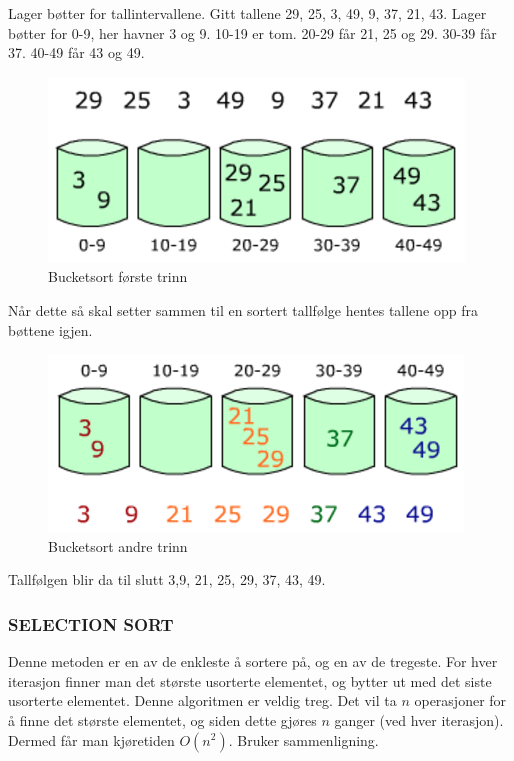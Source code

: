 \begin{boxed}
Lager bøtter for tallintervallene. Gitt tallene 29, 25, 3, 49, 9, 37, 21, 43. Lager bøtter for 0-9, her havner 3 og 9. 10-19 er tom. 20-29 får 21, 25 og 29. 30-39 får 37. 40-49 får 43 og 49.

\begin{figure}[H]
\includegraphics[scale=0.5]{images/bucketsort1}
\centering %
\caption{Bucketsort første trinn}
\label{fig:bucketsort1}
\end{figure}

Når dette så skal setter sammen til en sortert tallfølge hentes tallene opp fra bøttene igjen.

\begin{figure}[H]
\includegraphics[scale=0.5]{images/bucketsort2}
\centering %
\caption{Bucketsort andre trinn}
\label{fig:bucketsort2}
\end{figure}

Tallfølgen blir da til slutt 3,9, 21, 25, 29, 37, 43, 49.
\end{boxed}



\subsubsection{SELECTION SORT}
Denne metoden er en av de enkleste å sortere på, og en av de tregeste. For hver iterasjon finner man det største usorterte elementet, og bytter ut med det siste usorterte elementet. Denne algoritmen er veldig treg. Det vil ta $n$ operasjoner for å finne det største elementet, og siden dette gjøres $n$ ganger (ved hver iterasjon). Dermed får man kjøretiden $O(n^2)$. Bruker sammenligning.

